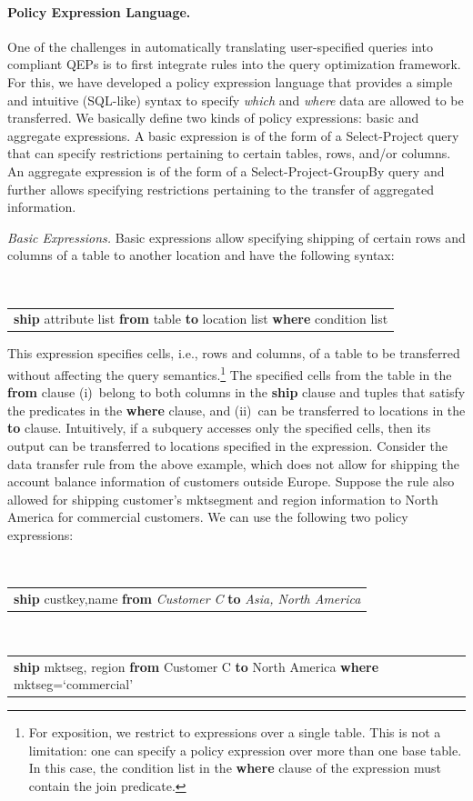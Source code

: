 \documentclass[11pt]{article}
\newenvironment{expression}{
  \par\addvspace{0.25\baselineskip}\noindent\tt\small
    \begin{tabular}{p{\columnwidth}}}{
      \end{tabular}\par\addvspace{0.25\baselineskip}
    }
\begin{document}
\paragraph{Policy Expression Language.}
\label{sec:policy_expressions}

One of the challenges in automatically translating
user-specified queries into compliant QEPs is to first
integrate rules into the query optimization framework. For
this, we have developed a policy expression language that
provides a simple and intuitive (SQL-like) syntax to specify
\emph{which} and \emph{where} data are allowed to be
transferred. We basically define two kinds of policy
expressions: basic and aggregate expressions. A basic
expression is of the form of a Select-Project query that can
specify restrictions pertaining to certain tables, rows,
and/or columns. An aggregate expression is of the form of a
Select-Project-GroupBy query and further allows specifying
restrictions pertaining to the transfer of aggregated
information.

\vspace{0.1cm}
\noindent\textit{Basic Expressions.} Basic expressions
allow specifying shipping of certain rows and columns of a
table to another location and have the following syntax:
\begin{expression}
  \textbf{ship} attribute list \textbf{from} table
  \textbf{to} location list \textbf{where} condition list
\end{expression}

This expression specifies cells, i.e., rows and columns, of
a table to be transferred without affecting the query
semantics.\footnote{For exposition, we restrict to
expressions over a single table. This is not a limitation:
one can specify a policy expression over more than one base
table. In this case, the condition list in the {\bf where}
clause of the expression must contain the join predicate.}
The specified cells from the table in the {\bf from} clause
(i)~belong to both columns in the {\bf ship} clause and
tuples that satisfy the predicates in the {\bf where}
clause, and (ii)~can be transferred to locations in the
\textbf{to} clause. Intuitively, if a subquery accesses only
the specified cells, then its output can be transferred to
locations specified in the expression. Consider the data
transfer rule from the above example, which does not allow
for shipping the account balance information of customers
outside Europe. Suppose the rule also allowed for shipping
customer's mktsegment and region information to North
America for commercial customers. We can use the following
two policy expressions:
  \begin{expression}
    \textbf{ship} custkey,name \textbf{from} \emph{Customer
    C} \textbf{to} \emph{Asia, North America}
  \end{expression}
\begin{expression}
  \textbf{ship} mktseg, region \textbf{from} Customer C
  \textbf{to} North America \textbf{where}
  mktseg=`commercial'
\end{expression}
\end{document}
